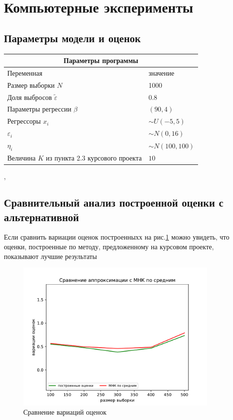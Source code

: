 \newpage
\section{Компьютерные эксперименты}
\subsection{Параметры модели и оценок}
\begin{center}
    \begin{tabular}{|p{5cm}|p{5cm}|}
        \hline
        \multicolumn{2}{|c|}{Параметры программы} \\
        \hline
        Переменная&значение\\
        \hline
        Размер выборки $N$& 1000\\
        \hline
        Доля выбросов $\widetilde{\varepsilon}$& 0.8\\
        \hline
        Параметры регрессии $\beta$& $(90,4)$\\
        \hline
        Регрессоры $x_i$ & $\sim U(-5,5)$\\
        \hline
        $\varepsilon_i$&$\sim N(0,16)$\\
        \hline
        $\eta_i$&$\sim N(100,100)$\\
        \hline
        Величина $K$ из пункта 2.3 курсового проекта &$10$\\
        \hline
    \end{tabular},
\end{center}

\subsection{Сравнительный анализ построенной оценки с альтернативной}
Если сравнить вариации оценок построенныхх на рис.\ref{pic1} можно увидеть, что оценки, построенные по методу, предложенному на курсовом проекте, показывают лучшие результаты
\begin{figure}[h!]
    \centering
    \includegraphics[width=100mm]{../images/OLS_GEM.pdf}
    \caption{Сравнение вариаций оценок\label{overflow}}
    \label{pic1}
\end{figure}


